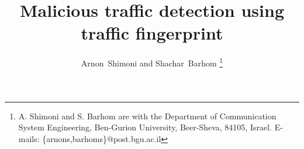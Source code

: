 \documentclass[13pt,journal,compsoc,onecolumn]{IEEEtran}
\begin{document}
%
\title{Malicious traffic detection using traffic fingerprint}
%
%
%
%

\author{Arnon~Shimoni and
        Shachar~Barhom%
\thanks{A. Shimoni and S. Barhom are with the Department of Communication System Engineering, Ben-Gurion University, Beer-Sheva, 84105, Israel. E-mails: \{arnons,barhoms\}@post.bgu.ac.il}}
\end{document}

